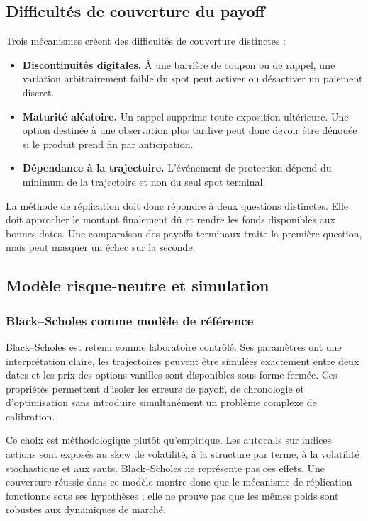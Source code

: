 \documentclass[12pt,a4paper]{article}
\newcommand{\1}{\mathbf{1}}
\begin{document}
\subsection{Difficultés de couverture du payoff}

Trois mécanismes créent des difficultés de couverture distinctes :

\begin{itemize}
\item \textbf{Discontinuités digitales.} À une barrière de coupon ou de rappel,
une variation arbitrairement faible du spot peut activer ou désactiver un paiement discret.
\item \textbf{Maturité aléatoire.} Un rappel supprime toute exposition ultérieure.
Une option destinée à une observation plus tardive peut donc devoir être dénouée
si le produit prend fin par anticipation.
\item \textbf{Dépendance à la trajectoire.} L'événement de protection dépend du
minimum de la trajectoire et non du seul spot terminal.
\end{itemize}

La méthode de réplication doit donc répondre à deux questions distinctes. Elle
doit approcher le montant finalement dû et rendre les fonds disponibles aux
bonnes dates. Une comparaison des payoffs terminaux traite la première question,
mais peut masquer un échec sur la seconde.

\subsection{Modèle risque-neutre et simulation}

\subsubsection*{Black--Scholes comme modèle de référence}

Black--Scholes est retenu comme laboratoire contrôlé. Ses paramètres ont une
interprétation claire, les trajectoires peuvent être simulées exactement entre
deux dates et les prix des options vanilles sont disponibles sous forme fermée.
Ces propriétés permettent d'isoler les erreurs de payoff, de chronologie et
d'optimisation sans introduire simultanément un problème complexe de calibration.

Ce choix est méthodologique plutôt qu'empirique. Les autocalls sur indices actions
sont exposés au skew de volatilité, à la structure par terme, à la volatilité
stochastique et aux sauts. Black--Scholes ne représente pas ces effets. Une
couverture réussie dans ce modèle montre donc que le mécanisme de réplication
fonctionne sous ses hypothèses ; elle ne prouve pas que les mêmes poids sont
robustes aux dynamiques de marché.
\end{document}
